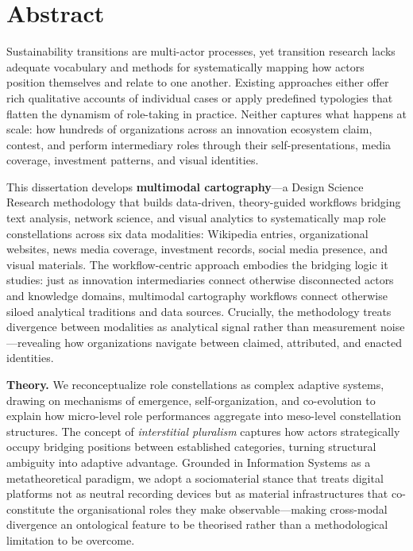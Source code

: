 \documentclass[../main.tex]{subfiles}
\begin{document}
\chapter*{Abstract}

Sustainability transitions are multi-actor processes, yet transition research lacks adequate vocabulary and methods for systematically mapping how actors position themselves and relate to one another. Existing approaches either offer rich qualitative accounts of individual cases or apply predefined typologies that flatten the dynamism of role-taking in practice. Neither captures what happens at scale: how hundreds of organizations across an innovation ecosystem claim, contest, and perform intermediary roles through their self-presentations, media coverage, investment patterns, and visual identities.

This dissertation develops \textbf{multimodal cartography}---a Design Science Research methodology that builds data-driven, theory-guided workflows bridging text analysis, network science, and visual analytics to systematically map role constellations across six data modalities: Wikipedia entries, organizational websites, news media coverage, investment records, social media presence, and visual materials. The workflow-centric approach embodies the bridging logic it studies: just as innovation intermediaries connect otherwise disconnected actors and knowledge domains, multimodal cartography workflows connect otherwise siloed analytical traditions and data sources. Crucially, the methodology treats divergence between modalities as analytical signal rather than measurement noise---revealing how organizations navigate between claimed, attributed, and enacted identities.

\textbf{Theory.} We reconceptualize role constellations as complex adaptive systems, drawing on mechanisms of emergence, self-organization, and co-evolution to explain how micro-level role performances aggregate into meso-level constellation structures. The concept of \textit{interstitial pluralism} captures how actors strategically occupy bridging positions between established categories, turning structural ambiguity into adaptive advantage. Grounded in Information Systems as a metatheoretical paradigm, we adopt a sociomaterial stance that treats digital platforms not as neutral recording devices but as material infrastructures that co-constitute the organisational roles they make observable---making cross-modal divergence an ontological feature to be theorised rather than a methodological limitation to be overcome.
\end{document}
